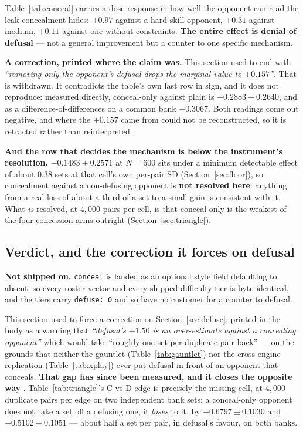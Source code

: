 \documentclass[11pt]{article}
\newcommand{\code}[1]{\texttt{#1}}
\begin{document}
Table~\ref{tab:conceal} carries a dose-response in how well the opponent can read the leak
concealment hides: $+0.97$ against a hard-skill opponent, $+0.31$ against medium, $+0.11$ against
one without constraints. \textbf{The entire effect is denial of defusal} --- not a general
improvement but a counter to one specific mechanism.

\textbf{A correction, printed where the claim was.} This section used to end with \emph{``removing
only the opponent's defusal drops the marginal value to $+0.157$''}. That is withdrawn. It
contradicts the table's own last row in sign, and it does not reproduce: measured directly,
conceal-only against plain is $-0.2883 \pm 0.2640$, and as a difference-of-differences on a common
bank $-0.3067$. Both readings come out negative, and where the $+0.157$ came from could not be
reconstructed, so it is retracted rather than reinterpreted \cite{concession}.

\textbf{And the row that decides the mechanism is below the instrument's resolution.} $-0.1483 \pm
0.2571$ at $N = 600$ sits under a minimum detectable effect of about $0.38$ sets at that cell's own
per-pair SD (Section~\ref{sec:floor}), so concealment against a non-defusing opponent is \textbf{not
resolved here}: anything from a real loss of about a third of a set to a small gain is consistent
with it. What \emph{is} resolved, at $4{,}000$ pairs per cell, is that conceal-only is the weakest
of the four concession arms outright (Section~\ref{sec:triangle}).

\subsection{Verdict, and the correction it forces on defusal}
\label{sec:concealverdict}

\textbf{Not shipped on.} \code{conceal} is landed as an optional style field defaulting to absent,
so every roster vector and every shipped difficulty tier is byte-identical, and the tiers carry
\code{defuse: 0} and so have no customer for a counter to defusal.

This section used to force a correction on Section~\ref{sec:defuse}, printed in the body as a
warning that \emph{``defusal's $+1.50$ is an over-estimate against a concealing opponent''} which
would take ``roughly one set per duplicate pair back'' --- on the grounds that neither the gauntlet
(Table~\ref{tab:gauntlet}) nor the cross-engine replication (Table~\ref{tab:xplay}) ever put
defusal in front of an opponent that conceals. \textbf{That gap has since been measured, and it
closes the opposite way} \cite{concession}. Table~\ref{tab:triangle}'s C vs D edge is precisely the
missing cell, at $4{,}000$ duplicate pairs per edge on two independent bank sets: a conceal-only
opponent does not take a set off a defusing one, it \emph{loses} to it, by $-0.6797 \pm 0.1030$ and
$-0.5102 \pm 0.1051$ --- about half a set per pair, in defusal's favour, on both banks.
\end{document}
